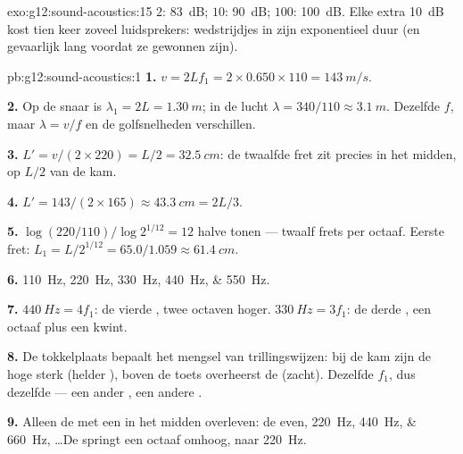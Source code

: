 \begin{solution}{exo:g12:sound-acoustics:15}
$2$: \qty{83}{dB}; $10$: \qty{90}{dB}; $100$: \qty{100}{dB}. Elke extra
\qty{+10}{dB} kost tien keer zoveel luidsprekers: wedstrijdjes in
 zijn exponentieel duur (en gevaarlijk lang voordat ze gewonnen
zijn).
\end{solution}

\begin{solution}{pb:g12:sound-acoustics:1}
\textbf{1.} $v = 2Lf_1 = 2 \times 0.650 \times 110 = \qty{143}{m/s}$.

\textbf{2.} Op de snaar is $\lambda_1 = 2L = \qty{1.30}{m}$; in de lucht
$\lambda = 340/110 \approx \qty{3.1}{m}$. Dezelfde $f$, maar
$\lambda = v/f$ en de golfsnelheden verschillen.

\textbf{3.} $L' = v/(2 \times 220) = L/2 = \qty{32.5}{cm}$: de twaalfde
fret zit precies in het midden, op $L/2$ van de kam.

\textbf{4.} $L' = 143/(2 \times 165) \approx \qty{43.3}{cm} = 2L/3$.

\textbf{5.} $\log(220/110)/\log 2^{1/12} = 12$ halve tonen --- twaalf
frets per octaaf. Eerste fret: $L_1 = L/2^{1/12} = 65.0/1.059
\approx \qty{61.4}{cm}$.

\textbf{6.} \qtylist{110;220;330;440;550}{Hz}.

\textbf{7.} $\qty{440}{Hz} = 4f_1$: de vierde , twee octaven
hoger. $\qty{330}{Hz} = 3f_1$: de derde , een octaaf plus een
kwint.

\textbf{8.} De tokkelplaats bepaalt het mengsel van trillingswijzen: bij
de kam zijn de hoge  sterk (helder ), boven de toets
overheerst de  (zacht). Dezelfde $f_1$, dus dezelfde 
--- een ander , een andere .

\textbf{9.} Alleen de  met een  in het midden overleven:
de even, \qtylist{220;440;660}{Hz}, \dots De  springt een
octaaf omhoog, naar \qty{220}{Hz}.


\end{solution}
